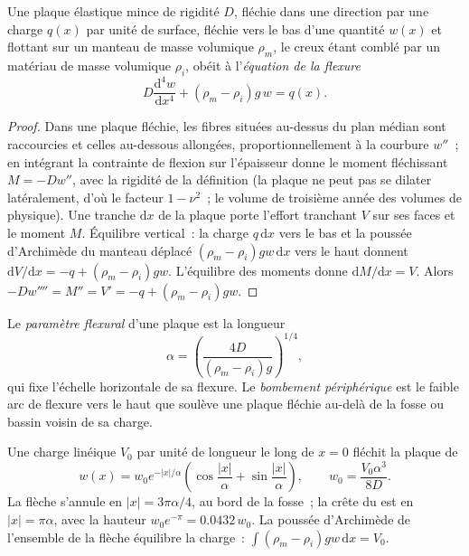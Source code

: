 \begin{theorem}\label{thm:b3:gravity-geodesy:plate}
Une plaque élastique mince de rigidité $D$, fléchie dans une direction par une charge $q(x)$
par unité de surface, fléchie vers le bas d'une quantité $w(x)$ et flottant sur un manteau de masse volumique
$\rho_m$, le creux étant comblé par un matériau de masse volumique $\rho_i$, obéit
à l'\emph{équation de la flexure}
\[
  D\frac{\mathrm d^4w}{\mathrm dx^4} + (\rho_m - \rho_i)g\,w = q(x) .
\]
\end{theorem}

\begin{proof}
Dans une plaque fléchie, les fibres situées au-dessus du plan médian sont raccourcies et celles au-dessous
allongées, proportionnellement à la courbure $w''$~; en intégrant la contrainte de
flexion sur l'épaisseur donne le moment fléchissant $M = -Dw''$, avec la
rigidité de la définition (la plaque ne peut pas se dilater latéralement, d'où le facteur
$1 - \nu^2$~; le volume de troisième année des volumes de physique). Une tranche $\mathrm dx$ de la plaque
porte l'effort tranchant $V$ sur ses faces et le moment $M$. Équilibre vertical~:
la charge $q\,\mathrm dx$ vers le bas et la poussée d'Archimède du manteau déplacé
$(\rho_m - \rho_i)gw\,\mathrm dx$ vers le haut donnent $\mathrm dV/\mathrm dx = -q +
(\rho_m - \rho_i)gw$. L'équilibre des moments donne $\mathrm dM/\mathrm dx = V$.
Alors $-Dw'''' = M'' = V' = -q + (\rho_m - \rho_i)gw$.
\end{proof}

\begin{definition}\label{def:b3:gravity-geodesy:alpha}
Le \emph{paramètre flexural} d'une plaque est la
longueur
\[
  \alpha = \left(\frac{4D}{(\rho_m - \rho_i)g}\right)^{1/4},
\]
qui fixe l'échelle horizontale de sa flexure. Le \emph{bombement périphérique}
est le faible arc de flexure vers le haut que soulève une plaque fléchie au-delà de la fosse ou
bassin voisin de sa charge.
\end{definition}

\begin{proposition}\label{prop:b3:gravity-geodesy:line}
Une charge linéique $V_0$ par unité de longueur le long de $x = 0$ fléchit la plaque de
\[
  w(x) = w_0e^{-|x|/\alpha}\left(\cos\frac{|x|}{\alpha} + \sin\frac{|x|}{\alpha}\right),
  \qquad w_0 = \frac{V_0\alpha^3}{8D} .
\]
  La flèche s'annule en $|x| = 3\pi\alpha/4$, au bord de la fosse~; la
crête du  est en $|x| = \pi\alpha$, avec la hauteur $w_0e^{-\pi} =
\num{0.0432}\,w_0$. La poussée d'Archimède de l'ensemble de la flèche équilibre la charge~:
$\int(\rho_m - \rho_i)gw\,\mathrm dx = V_0$.
\end{proposition}

